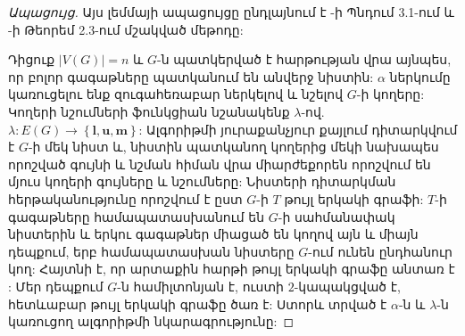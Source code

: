 \begin{proof}[Ապացույց]
Այս լեմմայի ապացույցը ընդլայնում է \cite{DeWerraSolot1991}-ի Պնդում 3.1-ում և \cite{GiaroKubale2004}-ի Թեորեմ 2.3-ում մշակված մեթոդը:

Դիցուք $|V(G)|=n$ և $G$-ն պատկերված է հարթության վրա այնպես, որ բոլոր գագաթները պատկանում են անվերջ նիստին: $\alpha$ ներկումը կառուցելու ենք զուգահեռաբար ներկելով և նշելով $G$-ի կողերը: Կողերի նշումների ֆունկցիան նշանակենք $\lambda$-ով. $\lambda : E(G) \rightarrow \left\{\bm{l},\bm{u},\bm{m}\right\}$: Ալգորիթմի յուրաքանչյուր քայլում դիտարկվում է $G$-ի մեկ նիստ և, նիստին պատկանող կողերից մեկի նախապես որոշված գույնի և նշման հիման վրա միարժեքորեն որոշվում են մյուս կողերի գույները և նշումները: Նիստերի դիտարկման հերթականությունը որոշվում է ըստ $G$-ի $T$ թույլ երկակի գրաֆի: $T$-ի գագաթները համապատասխանում են $G$-ի սահմանափակ նիստերին և երկու գագաթներ միացած են կողով այն և միայն դեպքում, երբ համապատասխան նիստերը $G$-ում ունեն ընդհանուր կող: Հայտնի է, որ արտաքին հարթի թույլ երկակի գրաֆը անտառ է \cite{Harary1974}: Մեր դեպքում $G$-ն համիլտոնյան է, ուստի $2$-կապակցված է, հետևաբար թույլ երկակի գրաֆը ծառ է: Ստորև տրված է $\alpha$-ն և $\lambda$-ն կառուցող ալգորիթմի նկարագրությունը:


\end{proof}
